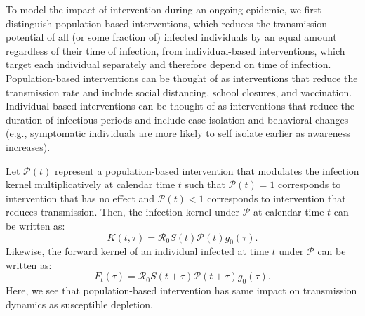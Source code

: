 \documentclass[12pt]{article}
\newcommand{\Rx}[1]{\ensuremath{{\mathcal R}_{#1}}\xspace}
\newcommand{\Ro}{\Rx{0}}
\newcommand{\PP}{{\mathcal P}}
\begin{document}
To model the impact of intervention during an ongoing epidemic, we first distinguish population-based interventions, which reduces the transmission potential of all (or some fraction of) infected individuals by an equal amount regardless of their time of infection, from individual-based interventions, which target each individual separately and therefore depend on time of infection.
Population-based interventions can be thought of as interventions that reduce the transmission rate and include social distancing, school closures, and vaccination.
Individual-based interventions can be thought of as interventions that reduce the duration of infectious periods and include case isolation and behavioral changes (e.g., symptomatic individuals are more likely to self isolate earlier as awareness increases).

Let $\PP(t)$ represent a population-based intervention that modulates the infection kernel multiplicatively at calendar time $t$ such that $\PP(t)=1$ corresponds to intervention that has no effect and $\PP(t) < 1$ corresponds to intervention that reduces transmission.
Then, the infection kernel under $\PP$ at calendar time $t$ can be written as:
\begin{equation}
K(t, \tau) = \Ro S(t) \PP(t) g_0(\tau).
\end{equation}
Likewise, the forward kernel of an individual infected at time $t$ under $\PP$ can be written as:
\begin{equation}
F_t(\tau) =  \Ro S(t+\tau) \PP(t + \tau) g_0(\tau).
\end{equation}
Here, we see that population-based intervention has same impact on transmission dynamics as susceptible depletion.
\end{document}
